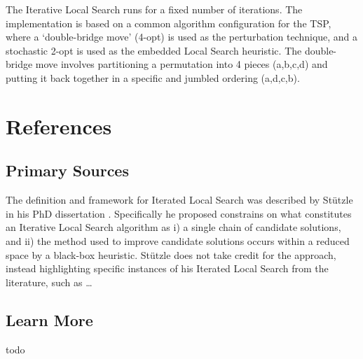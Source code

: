 \documentclass[a4paper, 11pt]{article}
\begin{document}
The Iterative Local Search runs for a fixed number of iterations. The implementation is based on a common algorithm configuration for the TSP, where a `double-bridge move' (4-opt) is used as the perturbation technique, and a stochastic 2-opt is used as the embedded Local Search heuristic.
The double-bridge move involves partitioning a permutation into 4 pieces (a,b,c,d) and putting it back together in a specific and jumbled ordering (a,d,c,b).



\section{References}
\label{sec:references}


% 
% 
\subsection{Primary Sources}
The definition and framework for Iterated Local Search was described by St\"utzle in his PhD dissertation \cite{Stutzle1998}. Specifically he proposed constrains on what constitutes an Iterative Local Search algorithm as i) a single chain of candidate solutions, and ii) the method used to improve candidate solutions occurs within a reduced space by a black-box heuristic.
St\"utzle does not take credit for the approach, instead highlighting specific instances of his Iterated Local Search from the literature, such as \ldots

% 
% 
\subsection{Learn More}
todo
\end{document}
